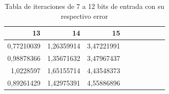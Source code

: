 \begin{table}[htbp]
  \centering
  \caption{Tabla de iteraciones de 7 a 12 bits de entrada con su respectivo error}
    \begin{tabular}{rrrrrrrrr}
    \toprule
    13    & 14    & 15 \\
    \midrule
    0,77210039 & 1,26359914 & 3,47221991 \\
    0,98878366 & 1,35671632 & 3,47967437 \\
    1,0228597 & 1,65155714 & 4,43548373 \\
    0,89261429 & 1,42975391 & 4,55886896 \\
    \bottomrule
    \end{tabular}%
  \label{tab:errores2}%
\end{table}%
